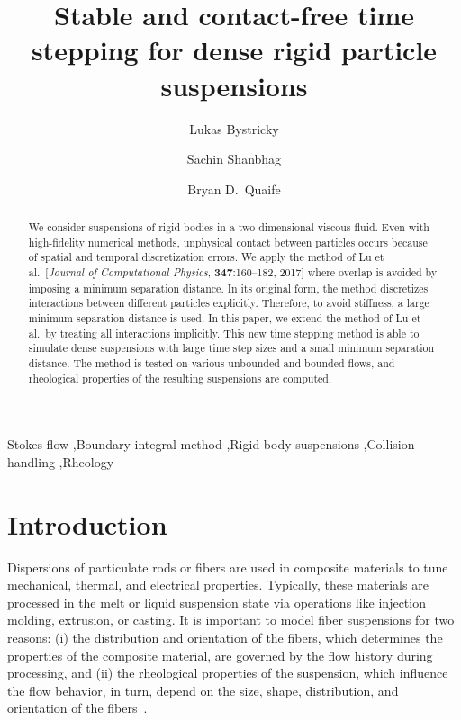 \documentclass[preprint, 10pt]{elsarticle}
\begin{document}
\title{Stable and contact-free time stepping for dense rigid particle
suspensions}

\author[Lukas]{Lukas Bystricky}
\author[Lukas]{Sachin Shanbhag}
\author[Bryan]{Bryan D.~Quaife}
\address[Lukas]{Department of Scientific Computing, Florida State University,
Tallahassee, FL, 32306.}
\address[Bryan]{Department of Scientific Computing and Geophysical Fluid
Dynamics Institute, Florida State University, Tallahassee, FL, 32306.}

\begin{abstract} 
We consider suspensions of rigid bodies in a two-dimensional viscous
fluid. Even with high-fidelity numerical methods, unphysical contact
between particles occurs because of spatial and temporal discretization
errors.  We apply the method of Lu et al.~[{\em Journal of Computational
Physics}, {\bf 347}:160--182, 2017] where overlap is avoided by
imposing a minimum separation distance.  In its original form, the
method discretizes interactions between different particles explicitly.
Therefore, to avoid stiffness, a large minimum separation distance is
used.  In this paper, we extend the method of Lu et al.~by treating all
interactions implicitly.  This new time stepping method is able to
simulate dense suspensions with large time step sizes and a small
minimum separation distance.  The method is tested on various unbounded
and bounded flows, and rheological properties of the resulting
suspensions are computed.

\end{abstract}

\begin{keyword}
  Stokes flow \sep Boundary integral method \sep Rigid body suspensions
  \sep Collision handling \sep Rheology 
\end{keyword}

\maketitle


\section{Introduction\label{s:intro}}
Dispersions of particulate rods or fibers are used in composite
materials to tune mechanical, thermal, and electrical properties.
Typically, these materials are processed in the melt or liquid
suspension state via operations like injection molding, extrusion, or
casting. It is important to model fiber suspensions for two reasons: (i)
the distribution and orientation of the fibers, which determines the
properties of the composite material, are governed by the flow history
during processing, and (ii) the rheological properties of the
suspension, which influence the flow behavior, in turn, depend on the
size, shape, distribution, and orientation of the
fibers~\cite{larsoncf}.
\end{document}

